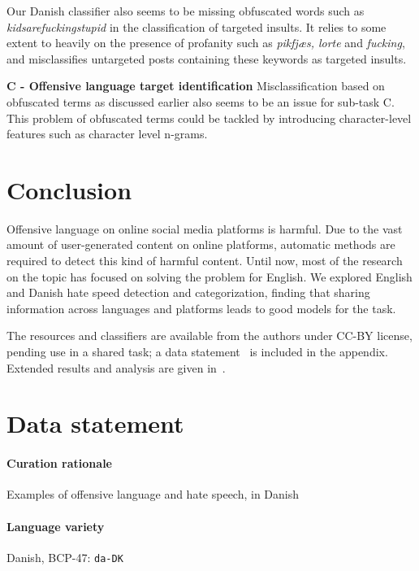 \documentclass{article}
\begin{document}
Our Danish classifier also seems to be missing obfuscated words such as \textit{kidsarefuckingstupid} in the classification of targeted insults. It relies to some extent to heavily on the presence of profanity such as \textit{pikfjæs, lorte} and \textit{fucking}, and misclassifies untargeted posts containing these keywords as targeted insults. 

\textbf{C - Offensive language target identification}
Misclassification based on obfuscated terms as discussed  earlier also seems to be an issue for sub-task C. This problem of obfuscated terms could be tackled by introducing character-level features such as character level n-grams.



\section{Conclusion}\label{ch:conclusion}

Offensive language on online social media platforms is harmful. Due to the vast amount of user-generated content on online platforms, automatic methods are required to detect this kind of harmful content. Until now, most of the research on the topic has focused on solving the problem for English. We explored English and Danish hate speed detection and categorization, finding that sharing information across languages and platforms leads to good models for the task.

The resources and classifiers are available from the authors under CC-BY license, pending use in a shared task; a data statement~\cite{bender-friedman-2018-data} is included in the appendix. Extended results and analysis are given in~\cite{gusi}.


  


\appendix

\clearpage
\section{Data statement}
\label{appendix:datastatement}


\paragraph{Curation rationale} Examples of offensive language and hate speech, in Danish

\paragraph{Language variety} Danish, BCP-47: {\tt \small da-DK}
\end{document}
